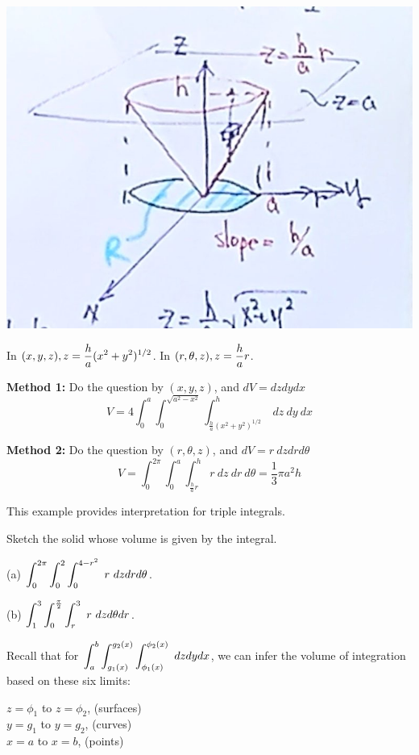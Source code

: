 \begin{spacing}{1.3}
    \begin{center}
        \includegraphics[scale=0.25]{images/Ch14-int-cylind-eg1.JPG}
    \end{center}

    In $(x,y,z), \displaystyle z=\frac{h}{a}(x^2+y^2)^{1/2}$. \quad 
    In $\displaystyle (r,\theta,z), z=\frac{h}{a}r$.

    {\bf Method 1:} Do the question by $(x,y,z)$, and $dV=dzdydx$
    $$V=4\int_{0}^a\int_0^{\sqrt{a^2-x^2}}\int_{\frac{h}{a}(x^2+y^2)^{1/2}}^{h}\ dz\ dy\ dx$$

    {\bf Method 2:} Do the question by $(r,\theta,z)$, and $dV=r\ dzdrd\theta$
    $$V=\int_0^{2\pi} \int_0^a \int_{\frac{h}{a}r}^h\ r\ dz\ dr\ d\theta=\dfrac{1}{3}\pi a^2h$$

    \newpage
    {\blue This example provides interpretation for triple integrals.}

    \eg Sketch the solid whose volume is given by the integral.

    (a) $\displaystyle \int_0^{2\pi} \int_0^2 \int_0^{4-r^2}\ r\ dzdrd\theta$.

    (b) $\displaystyle \int_1^3 \int_0^{\frac{\pi}{2}} \int_r^3\ r\ dzd\theta dr$.

    \sol Recall that for $\displaystyle \int_a^b \int_{g_1(x)}^{g_2(x)} \int_{\phi_1(x)}^{\phi_2(x)}\ dzdydx$,
    we can infer the volume of integration based on these six limits: 

    $z=\phi_1$ to $z=\phi_2$, (surfaces)\\
    $y=g_1$ to $y=g_2$, (curves)\\
    $x=a$ to $x=b$, (points)


\end{spacing}
